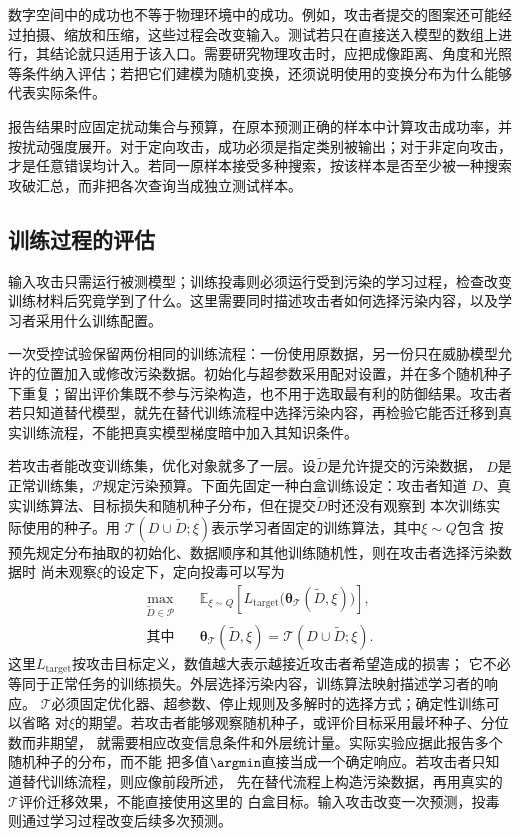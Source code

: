 数字空间中的成功也不等于物理环境中的成功。例如，攻击者提交的图案还可能经过拍摄、缩放和压缩，这些过程会改变输入。测试若只在直接送入模型的数组上进行，其结论就只适用于该入口。需要研究物理攻击时，应把成像距离、角度和光照等条件纳入评估；若把它们建模为随机变换，还须说明使用的变换分布为什么能够代表实际条件。

报告结果时应固定扰动集合与预算，在原本预测正确的样本中计算攻击成功率，并按扰动强度展开。对于定向攻击，成功必须是指定类别被输出；对于非定向攻击，才是任意错误均计入。若同一原样本接受多种搜索，按该样本是否至少被一种搜索攻破汇总，而非把各次查询当成独立测试样本。

\subsection{训练过程的评估}
\label{sec:security-training-test}

输入攻击只需运行被测模型；训练投毒则必须运行受到污染的学习过程，检查改变训练材料后究竟学到了什么。这里需要同时描述攻击者如何选择污染内容，以及学习者采用什么训练配置。

一次受控试验保留两份相同的训练流程：一份使用原数据，另一份只在威胁模型允许的位置加入或修改污染数据。初始化与超参数采用配对设置，并在多个随机种子下重复；留出评价集既不参与污染构造，也不用于选取最有利的防御结果。攻击者若只知道替代模型，就先在替代训练流程中选择污染内容，再检验它能否迁移到真实训练流程，不能把真实模型梯度暗中加入其知识条件。

若攻击者能改变训练集，优化对象就多了一层。设$\widetilde D$是允许提交的污染数据，
$D$是正常训练集，$\mathcal P$规定污染预算。下面先固定一种白盒训练设定：攻击者知道
$D$、真实训练算法、目标损失和随机种子分布，但在提交$\widetilde D$时还没有观察到
本次训练实际使用的种子。用
$\mathcal T(D\cup\widetilde D;\xi)$表示学习者固定的训练算法，其中$\xi\sim Q$包含
按预先规定分布抽取的初始化、数据顺序和其他训练随机性，则在攻击者选择污染数据时
尚未观察$\xi$的设定下，定向投毒可以写为
\begin{equation}
 \begin{aligned}
 \max_{\widetilde D\in\mathcal P}\quad&
 \mathbb E_{\xi\sim Q}
 \left[L_{\mathrm{target}}\bigl(\bm{\theta}_{\mathcal T}
       (\widetilde D,\xi)\bigr)\right],\\
 \text{其中}\quad&
 \bm{\theta}_{\mathcal T}(\widetilde D,\xi)
 =\mathcal T(D\cup\widetilde D;\xi).
 \end{aligned}
 \label{eq:security-poison-bilevel}
\end{equation}
这里$L_{\mathrm{target}}$按攻击目标定义，数值越大表示越接近攻击者希望造成的损害；
它不必等同于正常任务的训练损失。外层选择污染内容，训练算法映射描述学习者的响应。
$\mathcal T$必须固定优化器、超参数、停止规则及多解时的选择方式；确定性训练可以省略
对$\xi$的期望。若攻击者能够观察随机种子，或评价目标采用最坏种子、分位数而非期望，
就需要相应改变信息条件和外层统计量。实际实验应据此报告多个随机种子的分布，而不能
把多值$\argmin$直接当成一个确定响应。若攻击者只知道替代训练流程，则应像前段所述，
先在替代流程上构造污染数据，再用真实的$\mathcal T$评价迁移效果，不能直接使用这里的
白盒目标。输入攻击改变一次预测，投毒则通过学习过程改变后续多次预测。

